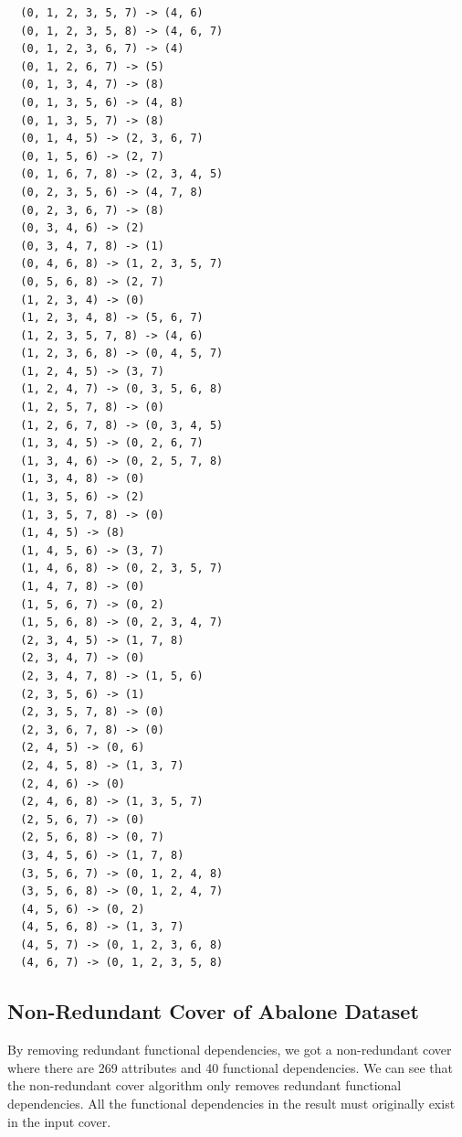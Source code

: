 \documentclass[11pt]{book}
\begin{document}
\begin{verbatim}
  (0, 1, 2, 3, 5, 7) -> (4, 6)
  (0, 1, 2, 3, 5, 8) -> (4, 6, 7)
  (0, 1, 2, 3, 6, 7) -> (4)
  (0, 1, 2, 6, 7) -> (5)
  (0, 1, 3, 4, 7) -> (8)
  (0, 1, 3, 5, 6) -> (4, 8)
  (0, 1, 3, 5, 7) -> (8)
  (0, 1, 4, 5) -> (2, 3, 6, 7)
  (0, 1, 5, 6) -> (2, 7)
  (0, 1, 6, 7, 8) -> (2, 3, 4, 5)
  (0, 2, 3, 5, 6) -> (4, 7, 8)
  (0, 2, 3, 6, 7) -> (8)
  (0, 3, 4, 6) -> (2)
  (0, 3, 4, 7, 8) -> (1)
  (0, 4, 6, 8) -> (1, 2, 3, 5, 7)
  (0, 5, 6, 8) -> (2, 7)
  (1, 2, 3, 4) -> (0)
  (1, 2, 3, 4, 8) -> (5, 6, 7)
  (1, 2, 3, 5, 7, 8) -> (4, 6)
  (1, 2, 3, 6, 8) -> (0, 4, 5, 7)
  (1, 2, 4, 5) -> (3, 7)
  (1, 2, 4, 7) -> (0, 3, 5, 6, 8)
  (1, 2, 5, 7, 8) -> (0)
  (1, 2, 6, 7, 8) -> (0, 3, 4, 5)
  (1, 3, 4, 5) -> (0, 2, 6, 7)
  (1, 3, 4, 6) -> (0, 2, 5, 7, 8)
  (1, 3, 4, 8) -> (0)
  (1, 3, 5, 6) -> (2)
  (1, 3, 5, 7, 8) -> (0)
  (1, 4, 5) -> (8)
  (1, 4, 5, 6) -> (3, 7)
  (1, 4, 6, 8) -> (0, 2, 3, 5, 7)
  (1, 4, 7, 8) -> (0)
  (1, 5, 6, 7) -> (0, 2)
  (1, 5, 6, 8) -> (0, 2, 3, 4, 7)
  (2, 3, 4, 5) -> (1, 7, 8)
  (2, 3, 4, 7) -> (0)
  (2, 3, 4, 7, 8) -> (1, 5, 6)
  (2, 3, 5, 6) -> (1)
  (2, 3, 5, 7, 8) -> (0)
  (2, 3, 6, 7, 8) -> (0)
  (2, 4, 5) -> (0, 6)
  (2, 4, 5, 8) -> (1, 3, 7)
  (2, 4, 6) -> (0)
  (2, 4, 6, 8) -> (1, 3, 5, 7)
  (2, 5, 6, 7) -> (0)
  (2, 5, 6, 8) -> (0, 7)
  (3, 4, 5, 6) -> (1, 7, 8)
  (3, 5, 6, 7) -> (0, 1, 2, 4, 8)
  (3, 5, 6, 8) -> (0, 1, 2, 4, 7)
  (4, 5, 6) -> (0, 2)
  (4, 5, 6, 8) -> (1, 3, 7)
  (4, 5, 7) -> (0, 1, 2, 3, 6, 8)
  (4, 6, 7) -> (0, 1, 2, 3, 5, 8)
\end{verbatim}

\subsection{Non-Redundant Cover of Abalone Dataset}

By removing redundant functional dependencies, we got a non-redundant cover where there are 269 attributes and 40 functional dependencies. We can see that the non-redundant cover algorithm only removes redundant functional dependencies. All the functional dependencies in the result must originally exist in the input cover.
\end{document}
